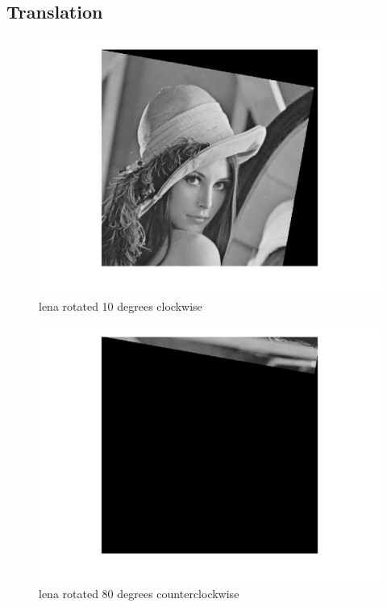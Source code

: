 \subsection{Translation}

\begin{figure}[H]
    \centering
    \includegraphics[scale=0.8]{lena_rot1}
    \caption{lena rotated 10 degrees clockwise}
\end{figure}

\begin{figure}[H]
    \centering
    \includegraphics[scale=0.8]{lena_rot2}
    \caption{lena rotated 80 degrees counterclockwise}
\end{figure}
